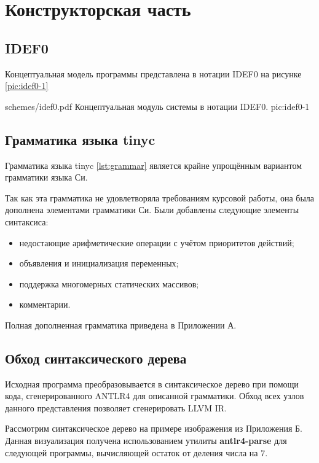 \section{Конструкторская часть}

\subsection{IDEF0}
Концептуальная модель программы представлена в нотации IDEF0 на рисунке \ref{pic:idef0-1}

\myImage
{schemes/idef0.pdf}
{Концептуальная модуль системы в нотации IDEF0.}
{pic:idef0-1}

\subsection{Грамматика языка tinyc}
Грамматика языка tinyc \ref{lst:grammar} является крайне упрощённым вариантом грамматики языка Си.

\label{lst:grammar}

Так как эта грамматика не удовлетворяла требованиям курсовой работы, она была дополнена элементами грамматики Си. Были добавлены следующие элементы синтаксиса:
\begin{itemize}
    \item недостающие арифметические операции с учётом приоритетов действий;
    \item объявления и инициализация переменных;
    \item поддержка многомерных статических массивов;
    \item комментарии.
\end{itemize}
Полная дополненная грамматика приведена в Приложении А.

\subsection{Обход синтаксического дерева}
Исходная программа преобразовывается в синтаксическое дерево при помощи кода, сгенерированного ANTLR4 для описанной грамматики. Обход всех узлов данного представления позволяет сгенерировать LLVM IR.

Рассмотрим синтаксическое дерево на примере изображения из Приложения Б. Данная визуализация получена использованием утилиты \textbf{antlr4-parse} для следующей программы, вычисляющей остаток от деления числа на 7.

\label{lst:fib}


